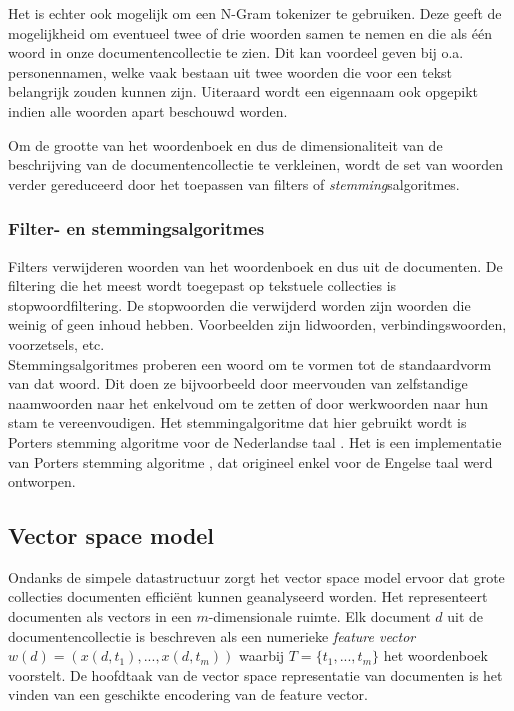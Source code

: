 Het is echter ook mogelijk om een N-Gram tokenizer \cite{McNamee2004} te gebruiken. Deze geeft de mogelijkheid om eventueel twee of drie woorden samen te nemen en die als \'e\'en woord in onze documentencollectie te zien. Dit kan voordeel geven bij o.a. personennamen, welke vaak bestaan uit twee woorden die voor een tekst belangrijk zouden kunnen zijn. Uiteraard wordt een eigennaam ook opgepikt indien alle woorden apart beschouwd worden.

Om de grootte van het woordenboek en dus de dimensionaliteit van de beschrijving van de documentencollectie te verkleinen, wordt de set van woorden verder gereduceerd door het toepassen van filters of \textit{stemming}salgoritmes. 

\subsubsection{Filter- en stemmingsalgoritmes}\label{stemming}
Filters verwijderen woorden van het woordenboek en dus uit de documenten. De filtering die het meest wordt toegepast op tekstuele collecties is stopwoordfiltering. De stopwoorden die verwijderd worden zijn woorden die weinig of geen inhoud hebben. Voorbeelden zijn lidwoorden, verbindingswoorden, voorzetsels, etc. \\
Stemmingsalgoritmes proberen een woord om te vormen tot de standaardvorm van dat woord. Dit doen ze bijvoorbeeld door meervouden van zelfstandige naamwoorden naar het enkelvoud om te zetten of door werkwoorden naar hun stam te vereenvoudigen. Het stemmingalgoritme dat hier gebruikt wordt is Porters stemming algoritme voor de Nederlandse taal \cite{Kraaij1994}. Het is een implementatie van Porters stemming algoritme \cite{Porter1980}, dat origineel enkel voor de Engelse taal werd ontworpen.

\subsection{Vector space model}\label{vector-space-model}
Ondanks de simpele datastructuur zorgt het vector space model ervoor dat grote collecties documenten effici\"ent kunnen geanalyseerd worden. Het representeert documenten als vectors in een $m$-dimensionale ruimte. Elk document $d$ uit de documentencollectie is beschreven als een numerieke\textit{ feature vector} $w(d) = (x(d,t_1),...,x(d,t_m))$ waarbij $T=\{t_1,...,t_m\}$ het woordenboek voorstelt. De hoofdtaak van de vector space representatie van documenten is het vinden van een geschikte encodering van de feature vector. 

